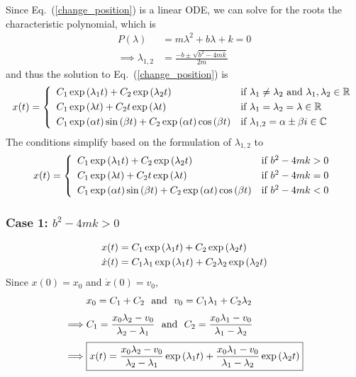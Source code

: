 \documentclass[12pt]{article}
\begin{document}
Since Eq.~(\ref{change_position}) is a linear ODE, we can solve for the roots the characteristic polynomial, which is
\begin{align*}
	P(\lambda) &= m\lambda^2 + b\lambda + k = 0 \\[.2cm]
	\implies \lambda_{1,2} &= \frac{-b \pm \sqrt{b^2 - 4mk}}{2m}
\end{align*}
and thus the solution to Eq.~(\ref{change_position}) is
\begin{align*}
	\label{general_soluntion}
	x(t) =  \left\{\begin{array}{ll}
		C_1\exp\qty(\lambda_1 t) + C_2\exp\qty(\lambda_2 t) & \text{if $\lambda_1 \neq \lambda_2$ and $\lambda_1,\lambda_2 \in \mathbb{R}$} \\[.1cm]
		C_1\exp\qty(\lambda t) + C_2 t\exp\qty(\lambda t) & \text{if $\lambda_1 = \lambda_2 = \lambda \in \mathbb{R}$} \\[.1cm]
		C_1\exp\qty(\alpha t)\sin\qty(\beta t) + C_2\exp\qty(\alpha t)\cos\qty(\beta t) & \text{if $\lambda_{1,2} = \alpha \pm \beta i \in \mathbb{C}$}
	\end{array}\right.
\end{align*}
The conditions simplify based on the formulation of $\lambda_{1,2}$ to
\begin{equation}
	\label{general_soluntion}
	x(t) =  \left\{\begin{array}{ll}
		C_1\exp\qty(\lambda_1 t) + C_2\exp\qty(\lambda_2 t) & \text{if $b^2 - 4mk > 0$} \\[.1cm]
		C_1\exp\qty(\lambda t) + C_2 t\exp\qty(\lambda t) & \text{if $b^2 - 4mk = 0$} \\[.1cm]
		C_1\exp\qty(\alpha t)\sin\qty(\beta t) + C_2\exp\qty(\alpha t)\cos\qty(\beta t) & \text{if $b^2 - 4mk < 0$}
	\end{array}\right.
\end{equation}

\subsubsection*{Case 1: $b^2 - 4mk > 0$}
\begin{align*}
	x(t) &= C_1\exp\qty(\lambda_1 t) + C_2\exp\qty(\lambda_2 t) \\
	\dot{x}(t) &= C_1\lambda_1\exp\qty(\lambda_1 t) + C_2\lambda_2\exp\qty(\lambda_2 t)
\end{align*}
Since $x(0) = x_0$ and $\dot{x}(0) = v_0$,
\begin{align*}
	&x_0 = C_1 + C_2\ \ \text{and}\ \ v_0 = C_1\lambda_1 + C_2\lambda_2 \\[.1cm]
	\implies &C_1 = \frac{x_0\lambda_2 - v_0}{\lambda_2 - \lambda_1}\ \ \text{and}\ \ C_2 = \frac{x_0\lambda_1 - v_0}{\lambda_1 - \lambda_2} \\[.1cm]
	\implies &\boxed{x(t) = \frac{x_0\lambda_2 - v_0}{\lambda_2 - \lambda_1}\exp\qty(\lambda_1 t) + \frac{x_0\lambda_1 - v_0}{\lambda_1 - \lambda_2}\exp\qty(\lambda_2 t)}
\end{align*}
\end{document}
